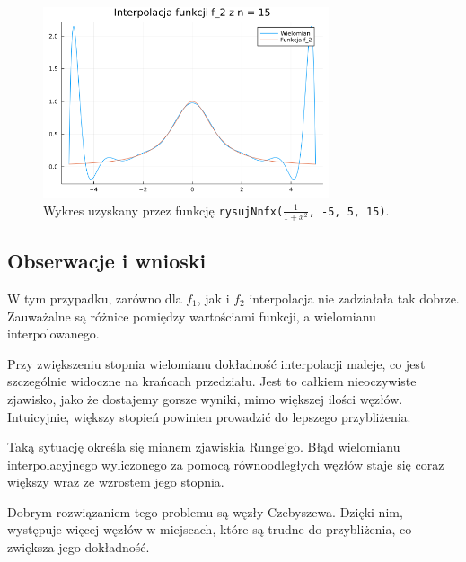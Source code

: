 \documentclass{article}
\begin{document}
\begin{figure}[H]
\centering
\includegraphics[width=0.75\textwidth]{task6_f2_n15.png}
\caption{Wykres uzyskany przez funkcję \texttt{rysujNnfx($\frac{1}{1+x^2}$, -5, 5, 15)}.}
\end{figure}

\subsection{Obserwacje i wnioski}
W tym przypadku, zarówno dla $f_1$, jak i $f_2$ interpolacja nie zadziałała tak dobrze.
Zauważalne są różnice pomiędzy wartościami funkcji, a wielomianu interpolowanego.

Przy zwiększeniu stopnia wielomianu dokładność interpolacji maleje, co jest szczególnie widoczne na krańcach przedziału.
Jest to całkiem nieoczywiste zjawisko, jako że dostajemy gorsze wyniki, mimo większej ilości węzłów.
Intuicyjnie, większy stopień powinien prowadzić do lepszego przybliżenia.

Taką sytuację określa się mianem zjawiskia Runge'go.
Błąd wielomianu interpolacyjnego wyliczonego za pomocą równoodległych węzłów staje się coraz większy wraz ze wzrostem jego stopnia.

Dobrym rozwiązaniem tego problemu są węzły Czebyszewa.
Dzięki nim, występuje więcej węzłów w miejscach, które są trudne do przybliżenia, co zwiększa jego dokładność.
\end{document}
